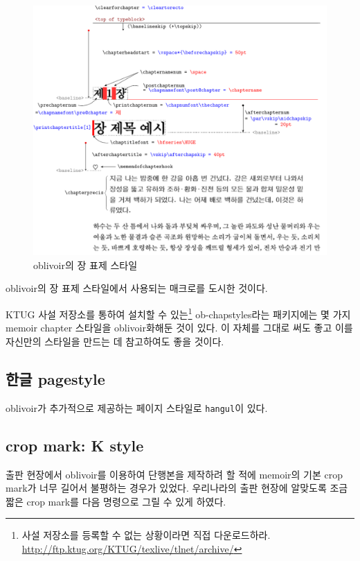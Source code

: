 \documentclass[
	12pt,
	a4paper,
	kosection,
	footnote,
	nobookmarks,
	microtype,
	figtabcapt,
]{oblivoir}
\begin{document}
\begin{figure}
\centering
\includegraphics[width=\textwidth]{chapstyfig}
\caption{oblivoir의 장 표제 스타일}\label{fig:chapsty}
\end{figure}

\는 \textsf{oblivoir}의 장 표제 스타일에서 사용되는
매크로를 도시한 것이다.

KTUG 사설 저장소를 통하여 설치할 수 있는\footnote{%
	사설 저장소를 등록할 수 없는 상황이라면 직접 다운로드하라. 
	\url{http://ftp.ktug.org/KTUG/texlive/tlnet/archive/}
}
ob-chapstyles라는 패키지에는 몇 가지 memoir
chapter 스타일을 oblivoir화해둔 것이 있다. 이 자체를 그대로 써도 좋고 이를 자신만의 스타일을
만드는 데 참고하여도 좋을 것이다.

\subsection{한글 pagestyle}

oblivoir가 추가적으로 제공하는 페이지 스타일로 \texttt{hangul}이 있다.
\begin{boxedverbatim}
\pagestyle{hangul}
\end{boxedverbatim}

\subsection{crop mark: K style}

출판 현장에서 oblivoir를 이용하여 단행본을 제작하려 할 적에 \textsf{memoir}의
기본 crop mark가 너무 길어서 불평하는 경우가 있었다. 우리나라의 출판 현장에
알맞도록 조금 짧은 crop mark를 다음 명령으로 그릴 수 있게 하였다.
\begin{boxedverbatim}
\trimKmark
\end{boxedverbatim}
\end{document}
